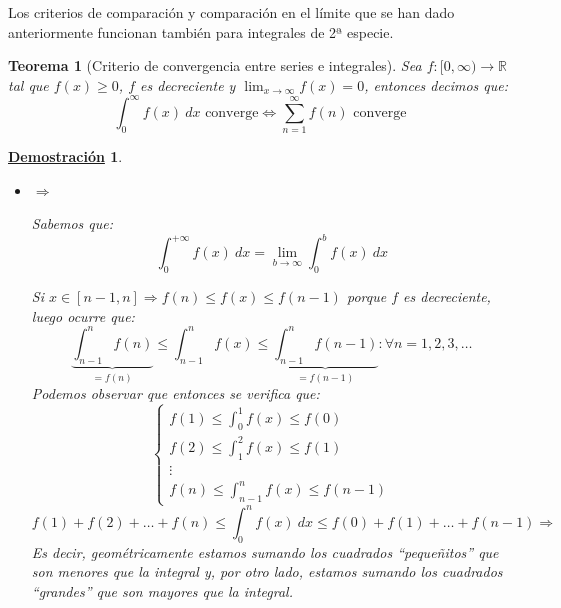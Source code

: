 \documentclass[10pt,a4paper,openright]{book}
\theoremstyle{break}
\newtheorem{theo}{Teorema}[chapter]
\newtheorem*{demo}{\underline{Demostración}}
\newcommand{\dif}[1]{\ d#1}
\begin{document}
Los criterios de comparación y comparación en el límite que se han dado anteriormente funcionan también para integrales de 2ª especie.

\begin{theo}[Criterio de convergencia entre series e integrales]
Sea $f:[0, \infty)\rightarrow \mathbb R$ tal que $f(x)\geq 0$, $f$ es decreciente y $\lim_{x \rightarrow \infty} f(x) = 0$, entonces decimos que:
$$\int_{0}^{\infty} f(x)\dif{x} \mbox{ converge} \Leftrightarrow \sum_{n = 1 }^{\infty} f(n)\mbox{ converge}$$
\end{theo}
\begin{demo}
\begin{itemize}
\item $\Rightarrow$

Sabemos que:
$$ \int_{0}^{+\infty} f(x)\dif{x} = \lim_{b \to \infty} \int_{0}^{b} f(x)\dif{x}$$

Si $x \in [n-1, n] \Rightarrow f(n) \leq f(x) \leq f(n-1)$ porque $f$ es decreciente, luego ocurre que:
$$\underbrace{\int_{n-1}^{n} f(n)}_{ = f(n)} \leq \int_{n-1}^{n} f(x) \leq \underbrace{\int_{n-1}^{n} f(n-1)}_{ = f(n-1)} : \forall n=1,2,3,\ldots$$
Podemos observar que entonces se verifica que:
$$\begin{cases} \displaystyle f(1) \leq  \int_{0}^{1} f(x) \leq f(0)\\ \displaystyle f(2) \leq  \int_{1}^{2} f(x) \leq f(1) \\ \displaystyle \vdots \\ \displaystyle f(n) \leq  \int_{n-1}^{n} f(x) \leq f(n-1)\end{cases}$$
$$ f(1) + f(2) + \ldots + f(n) \leq \int_{0}^{n} f(x)\dif{x} \leq f(0)+f(1) + \ldots + f(n-1)\Rightarrow$$
Es decir, geométricamente estamos sumando los cuadrados ``pequeñitos'' que son menores que la integral y, por otro lado, estamos sumando los cuadrados ``grandes'' que son mayores que la integral.

\end{itemize}
\end{demo}
\end{document}
